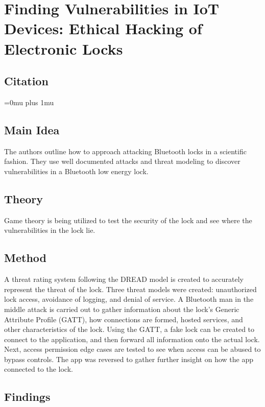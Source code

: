 \documentclass[letterpaper,12pt]{article}
\begin{document}
\pagebreak

\section{Finding Vulnerabilities in IoT Devices: Ethical Hacking of Electronic Locks}


\noindent
\subsection{Citation}
\Urlmuskip=0mu plus 1mu\relax
{}

\subsection{Main Idea}

\noindent
The authors outline how to approach attacking Bluetooth locks in a scientific fashion. They use well documented attacks and threat modeling to discover vulnerabilities in a Bluetooth low energy lock.
\subsection{Theory}

\noindent
Game theory is being utilized to test the security of the lock and see where the vulnerabilities in the lock lie. 

\subsection{Method}

\noindent
A threat rating system following the DREAD model is created to accurately represent the threat of the lock. Three threat models were created: unauthorized lock access, avoidance of logging, and denial of service. A Bluetooth man in the middle attack is carried out to gather information about the lock’s Generic Attribute Profile (GATT), how connections are formed, hosted services, and other characteristics of the lock. Using the GATT, a fake lock can be created to connect to the application, and then forward all information onto the actual lock. Next, access permission edge cases are tested to see when access can be abused to bypass controls. The app was reversed to gather further insight on how the app connected to the lock. 

\subsection{Findings}
\end{document}
